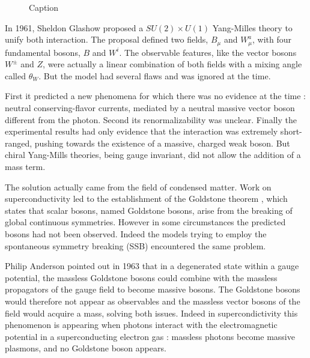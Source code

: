 \begin{figure}
    \centering
    \begin{subfigure}{.5\textwidth}
    \label{fig:fermi_int}
    \centering
    
    \end{subfigure}
    \begin{subfigure}{.5\textwidth}
    \label{fig:melectroweak}
    \centering
    
    \end{subfigure}
    \caption{Caption}
    \label{fig:etomununu}
\end{figure}

In 1961, Sheldon Glashow proposed a $SU(2) \times U(1)$ Yang-Milles theory \cite{GLASHOW1961579} to unify both interaction.  The proposal defined two fields, $B_{\mu}$ and $W_{\mu}^a$, with four fundamental bosons, $B$ and $W^i$. The observable features, like the vector bosons $W^{\pm}$ and $Z$, were actually a linear combination of both fields with a mixing angle called $\theta_W$. But the model had several flaws and was ignored at the time.

First it predicted a new phenomena for which there was no evidence at the time : neutral conserving-flavor currents, mediated by a neutral massive vector boson different from the photon. Second its renormalizability was unclear. Finally the experimental results had only evidence that the interaction was extremely short-ranged, pushing towards the existence of a massive, charged weak boson. But chiral Yang-Mills theories, being gauge invariant, did not allow the addition of a mass term. \newline

The solution actually came from the field of condensed matter. Work on superconductivity led to the establishment of the Goldstone theorem \cite{PhysRev.127.965}, which states that scalar bosons, named Goldstone bosons, arise from the breaking of global continuous symmetries. However in some circumstances the predicted bosons had not been observed. Indeed the models trying to employ the spontaneous symmetry breaking (SSB) encountered the same problem.

Philip Anderson pointed out in 1963 \cite{PhysRev.130.439} that in a degenerated state within a gauge potential, the massless Goldstone bosons could combine with the massless propagators of the gauge field to become massive bosons. The Goldstone bosons would therefore not appear as observables and the massless vector bosons of the field would acquire a mass, solving both issues. Indeed in supercondictivity this phenomenon is appearing when photons interact with the electromagnetic potential in a superconducting electron gas : massless photons become massive plasmons, and no Goldstone boson appears.


